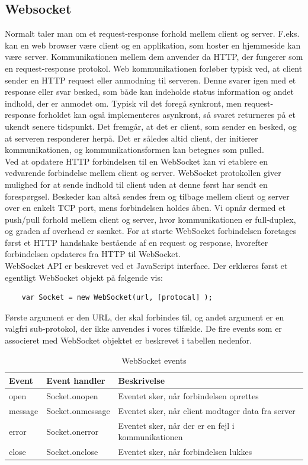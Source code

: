 \documentclass[Softwaredesign/Softwaredesign_main.tex]{subfiles}
\begin{document}
\subsection{Websocket}\label{sec:websocket_doc}
Normalt taler man om et request-response forhold mellem client og server. F.eks. kan en web browser være client og en applikation, som hoster en hjemmeside kan være server. Kommunikationen mellem dem anvender da HTTP, der fungerer som en request-response protokol. Web kommunikationen forløber typisk ved, at client sender en HTTP request eller anmodning til serveren. Denne svarer igen med et response eller svar besked, som både kan indeholde status information og andet indhold, der er anmodet om.\cite{http_wiki} Typisk vil det foregå synkront, men request-response forholdet kan også implementeres asynkront, så svaret returneres på et ukendt senere tidspunkt. Det fremgår, at det er client, som sender en besked, og at serveren responderer herpå. Det er således altid client, der initierer kommunikationen, og kommunikationsformen kan betegnes som pulled.\cite{websockets_getting_started}
\\Ved at opdatere HTTP forbindelsen til en WebSocket kan vi etablere en vedvarende forbindelse mellem client og server. WebSocket protokollen giver mulighed for at sende indhold til client uden at denne først har sendt en forespørgsel. Beskeder kan altså sendes frem og tilbage mellem client og server over en enkelt TCP port, mens forbindelsen holdes åben. Vi opnår dermed et push/pull forhold mellem client og server, hvor kommunikationen er full-duplex, og graden af overhead er sænket.\cite{websocket_wiki} For at starte WebSocket forbindelsen foretages først et HTTP handshake bestående af en request og response, hvorefter forbindelsen opdateres fra HTTP til WebSocket.
\\ WebSocket API er beskrevet ved et JavaScript interface.\cite{html5_websockets} Der erklæres først et egentligt WebSocket objekt på følgende vis:
\begin{lstlisting}
    var Socket = new WebSocket(url, [protocal] );
\end{lstlisting}
Første argument er den URL, der skal forbindes til, og andet argument er en valgfri sub-protokol, der ikke anvendes i vores tilfælde. De fire events som er associeret med WebSocket objektet er beskrevet i tabellen nedenfor.
\begin{table}[H]
\centering
\begin{tabular}{|L{0.15\textwidth}|L{0.25\textwidth}|L{0.3\textwidth}|}
\hline
\textbf{Event} & \textbf{Event handler} & \textbf{Beskrivelse} \\ \hline
open & Socket.onopen & Eventet sker, når forbindelsen oprettes \\ \hline
message & Socket.onmessage & Eventet sker, når client modtager data fra server \\ \hline
error & Socket.onerror & Eventet sker, når der er en fejl i kommunikationen \\ \hline
close & Socket.onclose & Eventet sker, når forbindelsen lukkes \\ \hline
\end{tabular}
\caption{WebSocket events}
\label{tab:websocket_events}
\end{table}
\end{document}

